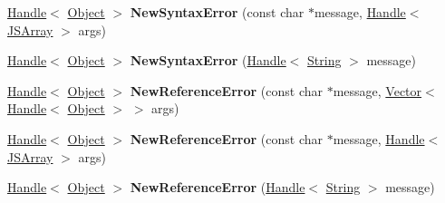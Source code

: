 \begin{DoxyCompactItemize}
\item 
\hypertarget{classv8_1_1internal_1_1_v8___f_i_n_a_l_a806a0acd0c635eb5fe790070e1ddde85}{}\hyperlink{classv8_1_1internal_1_1_handle}{Handle}$<$ \hyperlink{classv8_1_1internal_1_1_object}{Object} $>$ {\bfseries New\+Syntax\+Error} (const char $\ast$message, \hyperlink{classv8_1_1internal_1_1_handle}{Handle}$<$ \hyperlink{classv8_1_1internal_1_1_j_s_array}{J\+S\+Array} $>$ args)\label{classv8_1_1internal_1_1_v8___f_i_n_a_l_a806a0acd0c635eb5fe790070e1ddde85}

\item 
\hypertarget{classv8_1_1internal_1_1_v8___f_i_n_a_l_ae7a10f9620691689903cf6e49a3b4c6d}{}\hyperlink{classv8_1_1internal_1_1_handle}{Handle}$<$ \hyperlink{classv8_1_1internal_1_1_object}{Object} $>$ {\bfseries New\+Syntax\+Error} (\hyperlink{classv8_1_1internal_1_1_handle}{Handle}$<$ \hyperlink{classv8_1_1internal_1_1_string}{String} $>$ message)\label{classv8_1_1internal_1_1_v8___f_i_n_a_l_ae7a10f9620691689903cf6e49a3b4c6d}

\item 
\hypertarget{classv8_1_1internal_1_1_v8___f_i_n_a_l_af9c137c363b0475c742fa00b10497867}{}\hyperlink{classv8_1_1internal_1_1_handle}{Handle}$<$ \hyperlink{classv8_1_1internal_1_1_object}{Object} $>$ {\bfseries New\+Reference\+Error} (const char $\ast$message, \hyperlink{classv8_1_1internal_1_1_vector}{Vector}$<$ \hyperlink{classv8_1_1internal_1_1_handle}{Handle}$<$ \hyperlink{classv8_1_1internal_1_1_object}{Object} $>$ $>$ args)\label{classv8_1_1internal_1_1_v8___f_i_n_a_l_af9c137c363b0475c742fa00b10497867}

\item 
\hypertarget{classv8_1_1internal_1_1_v8___f_i_n_a_l_af0f79a9641424a1a4cf9f37fe1bec9f1}{}\hyperlink{classv8_1_1internal_1_1_handle}{Handle}$<$ \hyperlink{classv8_1_1internal_1_1_object}{Object} $>$ {\bfseries New\+Reference\+Error} (const char $\ast$message, \hyperlink{classv8_1_1internal_1_1_handle}{Handle}$<$ \hyperlink{classv8_1_1internal_1_1_j_s_array}{J\+S\+Array} $>$ args)\label{classv8_1_1internal_1_1_v8___f_i_n_a_l_af0f79a9641424a1a4cf9f37fe1bec9f1}

\item 
\hypertarget{classv8_1_1internal_1_1_v8___f_i_n_a_l_a383d153fe6b43ab7e83554b1e58d7974}{}\hyperlink{classv8_1_1internal_1_1_handle}{Handle}$<$ \hyperlink{classv8_1_1internal_1_1_object}{Object} $>$ {\bfseries New\+Reference\+Error} (\hyperlink{classv8_1_1internal_1_1_handle}{Handle}$<$ \hyperlink{classv8_1_1internal_1_1_string}{String} $>$ message)\label{classv8_1_1internal_1_1_v8___f_i_n_a_l_a383d153fe6b43ab7e83554b1e58d7974}


\end{DoxyCompactItemize}
